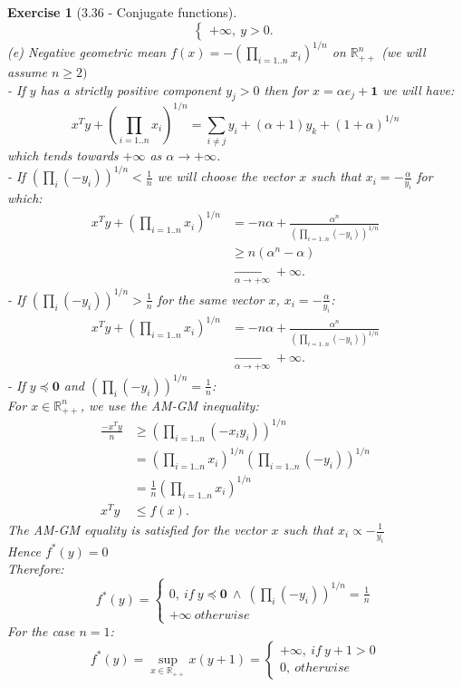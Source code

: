 \documentclass[11pt]{article}
\theoremstyle{exo}
\newtheorem*{exercise}{Exercise}
\newcommand{\R}{\mathbb{R}}
\newcommand{\1}{\mathbf{1}}
\newcommand{\0}{\mathbf{0}}
\begin{document}
\begin{exercise}[3.36 - Conjugate functions]
\[\begin{cases}
+\infty,\:y>0.
\end{cases}
\]
(e) Negative geometric mean $f(x)=-(\prod_{i=1..n}x_i)^{1/n}$ on $\R^n_{++}$ (we will assume $n\geq 2)$\\
- If $y$ has a strictly positive component $y_j>0$ then for $x=\alpha e_j+\1$ we will have:\[
x^Ty+(\prod_{i=1..n}x_i)^{1/n}=\sum_{i\neq j}y_i+(\alpha+1)y_k+(1+\alpha)^{1/n}\]
which tends towards $+\infty$ as $\alpha\to+\infty$.\\
- If $\left(\prod_i(-y_i)\right)^{1/n}<\frac{1}{n}$ we will choose the vector $x$ such that $x_i=-\frac{\alpha}{y_i}$ for which:
\[
\begin{split}
x^Ty+(\prod_{i=1..n}x_i)^{1/n}&=-n\alpha+\frac{\alpha^n}{(\prod_{i=1..n}(-y_i))^{1/n}}\\
&\geq n(\alpha^n-\alpha)\\
&\xrightarrow[\alpha\to+\infty]{}+\infty.
\end{split}\]
- If $\left(\prod_i(-y_i)\right)^{1/n}>\frac{1}{n}$ for the same vector $x$, $x_i=-\frac{\alpha}{y_i}$:
\[
\begin{split}
x^Ty+(\prod_{i=1..n}x_i)^{1/n}&=-n\alpha+\frac{\alpha^n}{(\prod_{i=1..n}(-y_i))^{1/n}}\\
&\xrightarrow[\alpha\to+\infty]{}+\infty.
\end{split}\]
- If $y\preceq \0$ and $\left(\prod_i(-y_i)\right)^{1/n}=\frac{1}{n}$:\\
For $x\in\R^n_{++}$, we use the AM-GM inequality:
\[
\begin{split}
\frac{-x^Ty}{n}&\geq(\prod_{i=1..n}(-x_iy_i))^{1/n}\\
&=(\prod_{i=1..n}x_i)^{1/n}(\prod_{i=1..n}(-y_i))^{1/n}\\
&= \frac{1}{n}(\prod_{i=1..n}x_i)^{1/n}\\
x^Ty&\leq f(x).
\end{split}\]
The AM-GM equality is satisfied for the vector $x$ such that $x_i\propto-\frac{1}{y_i}$\\
Hence $f^*(y)=0$\\
Therefore:
\[f^*(y)=\begin{cases}
0,\:if\:y\preceq \0\:\wedge\:\left(\prod_i(-y_i)\right)^{1/n}=\frac{1}{n}\\
+\infty\:otherwise
\end{cases}
\]
For the case $n=1$:\[
f^*(y)=\sup_{x\in\R_{++}}x(y+1)=\begin{cases}
+\infty,\:if\:y+1>0\\
0,\:otherwise
\end{cases}\]

\end{exercise}
\end{document}

